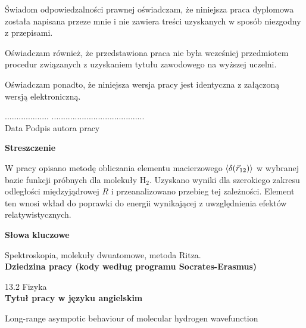 \documentclass[a4paper,12pt]{article}
\numberwithin{equation}{section}
\numberwithin{table}{section}
\numberwithin{figure}{section}
\begin{document}
\noindent Świadom odpowiedzalności prawnej oświadczam, że niniejsza praca dyplomowa została napisana przeze mnie i nie zawiera treści uzyskanych w sposób niezgodny z przepisami.
\vspace{0.3cm}

\noindent Oświadczam również, że przedstawiona praca nie była wcześniej przedmiotem procedur związanych z uzyskaniem tytułu zawodowego na wyższej uczelni.
\vspace{0.3cm}

\noindent Oświadczam ponadto, że niniejsza wersja pracy jest identyczna z załączoną wersją elektroniczną.
\vspace{1cm}

\noindent ................... \hfill ........................................\\
 Data \hfill Podpis autora pracy
\newpage
%
%
%
%
\newpage
\begin{center}
\textbf{Streszczenie}
\end{center}

W pracy opisano metodę obliczania elementu macierzowego $\braket{\delta({\vec{r}_{12}})}$  w wybranej bazie funkcji próbnych dla molekuły H$_2$. Uzyskano wyniki dla szerokiego zakresu odległości międzyjądrowej $R$ i przeanalizowano przebieg tej zależności. Element ten wnosi wkład do poprawki do energii wynikającej z uwzględnienia efektów relatywistycznych.
\vspace{2.5cm}
\begin{center}
\textbf{Słowa kluczowe}\vspace{0.3cm}

Spektroskopia, molekuły dwuatomowe, metoda Ritza.\\
\vspace{2.5cm}
\textbf{Dziedzina pracy (kody według programu Socrates-Erasmus)}\vspace{0.3cm}

13.2 Fizyka\\
\vspace{2.5cm}
\textbf{Tytuł pracy w języku angielskim}\vspace{0.3cm}

Long-range asympotic behaviour of molecular hydrogen wavefunction
\end{center}
\newpage
%
%
%
%
\newpage
\tableofcontents \newpage
\end{document}
